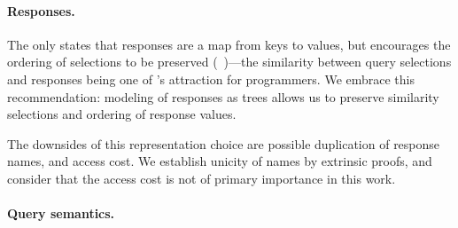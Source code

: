 

\paragraph{Responses.}
The \spec only states that responses are a map from keys to values, 
but encourages the ordering of selections to be preserved (\cf~\cite[\S7.2.2]{gqlspec})---the similarity between query selections and responses being one of \gql's attraction for programmers.  We embrace this recommendation: modeling of responses as trees allows us to preserve similarity \wrt selections and ordering of response values. %

The downsides of this representation choice are possible duplication of response names, and access cost. 
We establish unicity of names by extrinsic proofs, and consider that the access cost is not of primary importance in this work.


\paragraph{Query semantics.}

